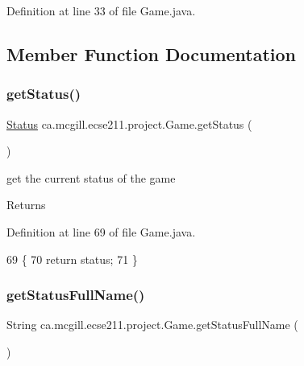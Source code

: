 Definition at line 33 of file Game.\+java.



\subsection{Member Function Documentation}
\mbox{\label{enumca_1_1mcgill_1_1ecse211_1_1project_1_1_game_a620374b3eeb3dd7e0abd26f3ced9053b}} 
\subsubsection{\texorpdfstring{get\+Status()}{getStatus()}}
{\footnotesize\ttfamily \hyperlink{enumca_1_1mcgill_1_1ecse211_1_1project_1_1_game_1_1_status}{Status} ca.\+mcgill.\+ecse211.\+project.\+Game.\+get\+Status (\begin{DoxyParamCaption}{ }\end{DoxyParamCaption})}

get the current status of the game

\begin{DoxyReturn}{Returns}

\end{DoxyReturn}


Definition at line 69 of file Game.\+java.


\begin{DoxyCode}
69                             \{
70     \textcolor{keywordflow}{return} status;
71   \}
\end{DoxyCode}
\mbox{\label{enumca_1_1mcgill_1_1ecse211_1_1project_1_1_game_a43a5763d183e0bcacd402c872c07273e}} 
\subsubsection{\texorpdfstring{get\+Status\+Full\+Name()}{getStatusFullName()}}
{\footnotesize\ttfamily String ca.\+mcgill.\+ecse211.\+project.\+Game.\+get\+Status\+Full\+Name (\begin{DoxyParamCaption}{ }\end{DoxyParamCaption})}

